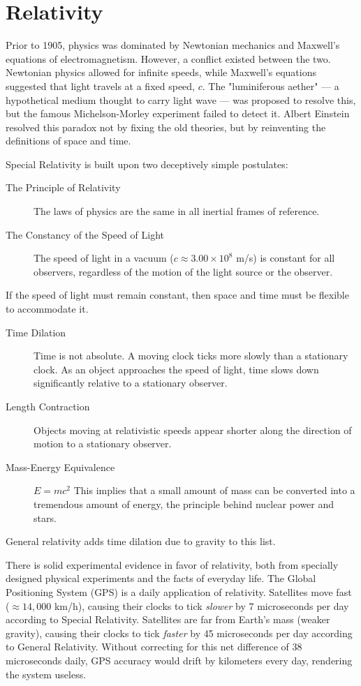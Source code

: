 \chapter{Relativity}
\label{relativity}

Prior to 1905, physics was dominated by Newtonian mechanics and Maxwell’s 
equations of electromagnetism. However, a conflict existed between 
the two. Newtonian physics allowed for infinite speeds, while Maxwell’s 
equations suggested that light travels at a fixed speed, $c$.
The "luminiferous aether" --- a hypothetical medium thought to carry 
light wave --- was proposed to resolve this, but the famous Michelson-Morley
experiment failed to detect it. Albert Einstein resolved this paradox 
not by fixing the old theories, but by reinventing the definitions of space and time.

Special Relativity  is built upon two deceptively simple postulates:
\begin{description}
    \item [The Principle of Relativity] 
       The laws of physics are the same in all inertial frames of reference.
   \item[The Constancy of the Speed of Light] 
       The speed of light in a vacuum ($c \approx 3.00 \times 10^8$ m/s) is constant for all observers, regardless of the motion of the light source or the observer.
\end{description}

If the speed of light must remain constant, then space and time must be flexible to accommodate it.
\begin{description}
    \item[Time Dilation] Time is not absolute. A moving clock ticks more slowly than a stationary clock. As an object approaches the speed of light, time slows down significantly relative to a stationary observer.
 \item[Length Contraction] Objects moving at relativistic speeds appear shorter along the direction of motion to a stationary observer.
 \item[Mass-Energy Equivalence] 
    $E = mc^2$
    This implies that a small amount of mass can be converted into a tremendous amount of energy, the principle behind nuclear power and stars.
\end{description}
General relativity adds time dilation due to gravity to this list.

There is solid  experimental evidence in favor of relativity, both 
from specially designed physical experiments and the facts of everyday life.
The Global Positioning System (GPS) is a daily application of relativity.
 Satellites move fast ($\approx 14,000$ km/h), causing their clocks to tick {\em slower} by 7 microseconds per day according to Special Relativity.
 Satellites are far from Earth's mass (weaker gravity), causing their clocks to tick {\em faster} by 45 microseconds per day according to General Relativity.
Without correcting for this net difference of 38 microseconds daily, GPS accuracy would drift by kilometers every day, rendering the system useless.

